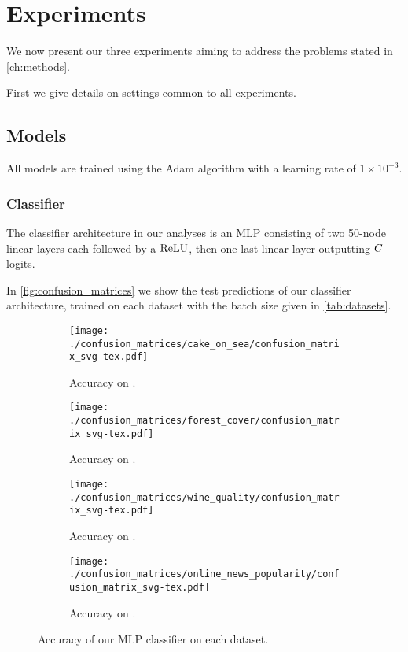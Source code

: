 \documentclass[../main.tex]{subfiles}
\begin{document}
\chapter{Experiments}

We now present our three experiments aiming to address the problems stated in \autoref{ch:methods}.

First we give details on settings common to all experiments.

\section{Models}

All models are trained using the Adam algorithm \cite{kingmaAdam2014} with a learning rate of $1 \times 10^{-3}$.

\subsection{Classifier}
\label{exp/classifiers}

The classifier architecture in our analyses is an MLP consisting of two 50-node linear layers each followed by a $\text{ReLU}$, then one last linear layer outputting $C$ logits.

In \autoref{fig:confusion_matrices} we show the test predictions of our classifier architecture, trained on each dataset with the batch size given in \autoref{tab:datasets}.
\begin{figure}
    \centering
    \begin{subfigure}[b]{0.4\textwidth}
        \centering
        \texttt{[image: ./confusion\_matrices/cake\_on\_sea/confusion\_matrix\_svg-tex.pdf]}
        \caption{Accuracy on \CakeOnSea.}
    \end{subfigure}
    \begin{subfigure}[b]{0.4\textwidth}
        \centering
        \texttt{[image: ./confusion\_matrices/forest\_cover/confusion\_matrix\_svg-tex.pdf]}
        \caption{Accuracy on \ForestCover.}
    \end{subfigure}

    \begin{subfigure}[b]{0.4\textwidth}
        \centering
        \texttt{[image: ./confusion\_matrices/wine\_quality/confusion\_matrix\_svg-tex.pdf]}
        \caption{Accuracy on \WineQuality.}
    \end{subfigure}
    \begin{subfigure}[b]{0.4\textwidth}
        \centering
        \texttt{[image: ./confusion\_matrices/online\_news\_popularity/confusion\_matrix\_svg-tex.pdf]}
        \caption{Accuracy on \OnlineNewsPopularity.}
    \end{subfigure}

    \caption{Accuracy of our MLP classifier on each dataset.}
    \label{fig:confusion_matrices}
\end{figure}
\end{document}
